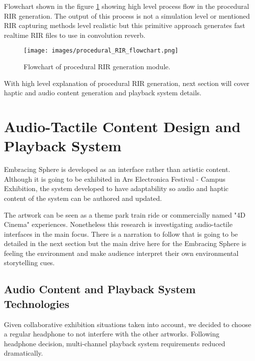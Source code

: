         Flowchart shown in the figure \ref{fig:FLOW} showing high level process flow in the procedural RIR generation. The output of this process is not a simulation level or mentioned RIR capturing methods level realistic but this primitive approach generates fast realtime RIR files to use in convolution reverb.\par
        
        \begin{figure}[H]
            \centering
            \texttt{[image: images/procedural\_RIR\_flowchart.png]}
            \caption{Flowchart of procedural RIR generation module.}
            \label{fig:FLOW}
        \end{figure}

        With high level explanation of procedural RIR generation, next section will cover haptic and audio content generation and playback system details.\par
    \section{Audio-Tactile Content Design and Playback System}
        Embracing Sphere is developed as an interface rather than artistic content. Although it is going to be exhibited in Ars Electronica Festival - Campus Exhibition, the system developed to have adaptability so audio and haptic content of the system can be authored and updated.\par

        The artwork can be seen as a theme park train ride or commercially named "4D Cinema" experiences. Nonetheless this research is investigating audio-tactile interfaces in the main focus. There is a narration to follow that is going to be detailed in the next section but the main drive here for the Embracing Sphere is feeling the environment and make audience interpret their own environmental storytelling cues.\par
        \subsection{Audio Content and Playback System Technologies}
            Given collaborative exhibition situations taken into account, we decided to choose a regular headphone to not interfere with the other artworks. Following headphone decision, multi-channel playback system requirements reduced dramatically.\par

